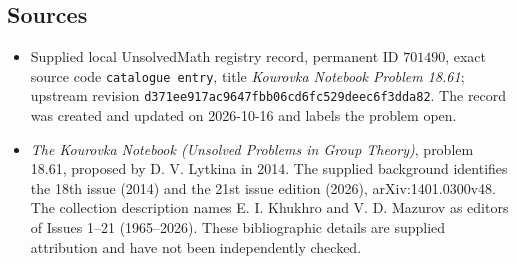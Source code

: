 \documentclass[11pt]{article}
\begin{document}
\subsection{Sources}
\begin{itemize}
\item Supplied local UnsolvedMath registry record, permanent ID \(701490\), exact source code \texttt{catalogue entry}, title \emph{Kourovka Notebook Problem 18.61}; upstream revision \texttt{d371ee917ac9647fbb06cd6fc529deec6f3dda82}. The record was created and updated on 2026-10-16 and labels the problem open.
\item \emph{The Kourovka Notebook (Unsolved Problems in Group Theory)}, problem 18.61, proposed by D. V. Lytkina in 2014. The supplied background identifies the 18th issue (2014) and the 21st issue edition (2026), arXiv:1401.0300v48. The collection description names E. I. Khukhro and V. D. Mazurov as editors of Issues 1--21 (1965--2026). These bibliographic details are supplied attribution and have not been independently checked.
\end{itemize}
\end{document}
